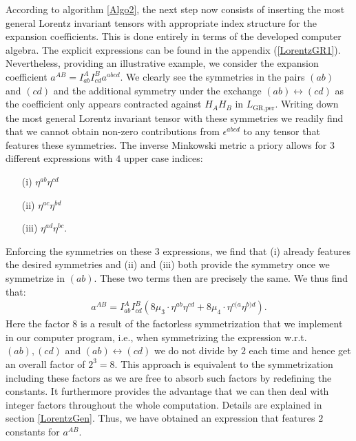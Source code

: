 According to algorithm \ref{Algo2}, the next step now consists of inserting the most general Lorentz invariant tensors with appropriate index structure for the expansion coefficients. This is done entirely in terms of the developed computer algebra. The explicit expressions can be found in the appendix (\ref{LorentzGR1}).
Nevertheless, providing an illustrative example, we consider the expansion coefficient $a^{AB} = I^{A}_{ab}I^{B}_{cd}a^{abcd}$. We clearly see the symmetries in the pairs $(ab)$ and $(cd)$ and the additional symmetry under the exchange $(ab) \leftrightarrow (cd)$ as the coefficient only appears contracted against $H_AH_B$ in $L_{\text{GR,per}}$. Writing down the most general Lorentz invariant tensor with these symmetries we readily find that we cannot obtain non-zero contributions from $\epsilon^{abcd}$ to any tensor that features these symmetries. The inverse Minkowski metric a priory allows for $3$ different expressions with $4$ upper case indices:
\begin{itemize}
    \item[(i)] $\eta^{ab} \eta^{cd}$ 
    \item[(ii)] $\eta^{ac} \eta^{bd}$ 
    \item[(iii)] $\eta^{ad} \eta^{bc}$.
\end{itemize}
Enforcing the symmetries on these $3$ expressions, we find that (i) already features the desired symmetries and (ii) and (iii) both provide the symmetry once we symmetrize in $(ab)$. These two terms then are precisely the same. We thus find that:
\begin{align}\label{ansatzExample}
    a^{AB} = I^{A}_{ab}I^{B}_{cd} \left ( 8\mu_3 \cdot \eta^{ab}\eta^{cd} + 8\mu_4 \cdot \eta^{c(a} \eta^{b)d}   \right ).
\end{align}
Here the factor $8$ is a result of the factorless symmetrization that we implement in our computer program, i.e., when symmetrizing the expression w.r.t.\ $(ab),(cd)$ and $(ab) \leftrightarrow (cd) $ we do not divide by $2$ each time and hence get an overall factor of $2^3=8$. This approach is equivalent to the symmetrization including these factors as we are free to absorb such factors by redefining the constants. It furthermore provides the advantage that we can then deal with integer factors throughout the whole computation. Details are explained in section \ref{LorentzGen}.
Thus, we have obtained an expression that features $2$ constants for $a^{AB}$.

